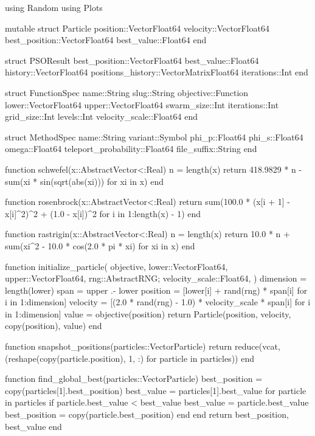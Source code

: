 \documentclass[a4paper, 14pt]{extarticle}
\begin{document}
\begin{breakablelisting}
using Random
using Plots

mutable struct Particle
    position::Vector{Float64}
    velocity::Vector{Float64}
    best_position::Vector{Float64}
    best_value::Float64
end

struct PSOResult
    best_position::Vector{Float64}
    best_value::Float64
    history::Vector{Float64}
    positions_history::Vector{Matrix{Float64}}
    iterations::Int
end

struct FunctionSpec
    name::String
    slug::String
    objective::Function
    lower::Vector{Float64}
    upper::Vector{Float64}
    swarm_size::Int
    iterations::Int
    grid_size::Int
    levels::Int
    velocity_scale::Float64
end

struct MethodSpec
    name::String
    variant::Symbol
    phi_p::Float64
    phi_s::Float64
    omega::Float64
    teleport_probability::Float64
    file_suffix::String
end

function schwefel(x::AbstractVector{<:Real})
    n = length(x)
    return 418.9829 * n - sum(xi * sin(sqrt(abs(xi))) for xi in x)
end

function rosenbrock(x::AbstractVector{<:Real})
    return sum(100.0 * (x[i + 1] - x[i]^2)^2 + (1.0 - x[i])^2 for i in 1:length(x) - 1)
end

function rastrigin(x::AbstractVector{<:Real})
    n = length(x)
    return 10.0 * n + sum(xi^2 - 10.0 * cos(2.0 * pi * xi) for xi in x)
end

function initialize_particle(
    objective,
    lower::Vector{Float64},
    upper::Vector{Float64},
    rng::AbstractRNG;
    velocity_scale::Float64,
)
    dimension = length(lower)
    span = upper .- lower
    position = [lower[i] + rand(rng) * span[i] for i in 1:dimension]
    velocity = [(2.0 * rand(rng) - 1.0) * velocity_scale * span[i] for i in 1:dimension]
    value = objective(position)
    return Particle(position, velocity, copy(position), value)
end

function snapshot_positions(particles::Vector{Particle})
    return reduce(vcat, (reshape(copy(particle.position), 1, :) for particle in particles))
end

function find_global_best(particles::Vector{Particle})
    best_position = copy(particles[1].best_position)
    best_value = particles[1].best_value
    for particle in particles
        if particle.best_value < best_value
            best_value = particle.best_value
            best_position = copy(particle.best_position)
        end
    end
    return best_position, best_value
end


\end{breakablelisting}
\end{document}
